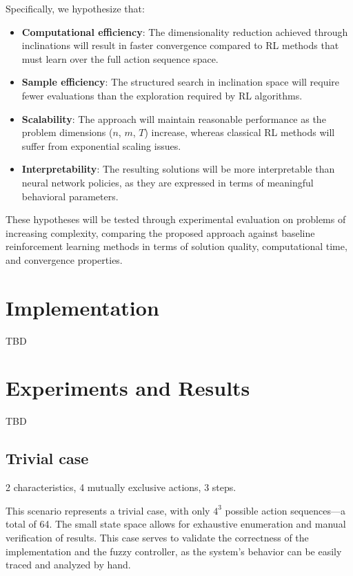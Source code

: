 \documentclass[11pt, a4paper]{article}
\begin{document}
Specifically, we hypothesize that:

\begin{itemize}
    \item \textbf{Computational efficiency}: The dimensionality reduction achieved through inclinations will result in faster convergence compared to RL methods that must learn over the full action sequence space.
    
    \item \textbf{Sample efficiency}: The structured search in inclination space will require fewer evaluations than the exploration required by RL algorithms.
    
    \item \textbf{Scalability}: The approach will maintain reasonable performance as the problem dimensions ($n$, $m$, $T$) increase, whereas classical RL methods will suffer from exponential scaling issues.
    
    \item \textbf{Interpretability}: The resulting solutions will be more interpretable than neural network policies, as they are expressed in terms of meaningful behavioral parameters.
\end{itemize}

These hypotheses will be tested through experimental evaluation on problems of increasing complexity, comparing the proposed approach against baseline reinforcement learning methods in terms of solution quality, computational time, and convergence properties.
	\section{Implementation}

    TBD

	\section{Experiments and Results}

    TBD 

	\subsection{Trivial case}

	2 characteristics, 4 mutually exclusive actions, 3 steps.

	This scenario represents a trivial case, with only $4^{3}$ possible action sequences—a total of 64.
	The small state space allows for exhaustive enumeration and manual verification of results.
	This case serves to validate the correctness of the implementation and the fuzzy controller, as the system's behavior can be easily traced and analyzed by hand.
\end{document}
